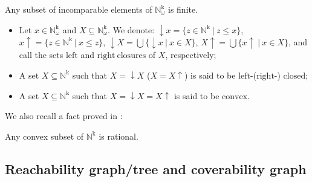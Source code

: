 \documentclass[a4paper]{llncs}
\begin{document}
\begin{lemma} 
\label{l26}
Any subset of incomparable elements of  $\mathbb{N}_\omega^\mathrm{k}$ is finite.
\end{lemma}

\begin{definition}
\label{def_clos}
\begin{itemize}
\item Let $x \in \mathbb{N}_\omega^\mathrm{k}$ and $X\subseteq\mathbb{N}_\omega^\mathrm{k}$. We denote:  $\downarrow x = \{z\in \mathbb{N}^\mathrm{k}\ |\ z\leq x\}$, \\$x\uparrow  = \{z\in \mathbb{N}^\mathrm{k}\ | \ x\leq z\}$,  $\downarrow X = \bigcup\{\downarrow \!x\ | \ x\in X\}$, $ X\uparrow = \bigcup\{ x\uparrow\ |\ x \in X\}$, and call the sets $\mathrm{left}$ and $\mathrm{right\ closures}$ of $X$, respectively;
\item A set $X\subseteq \mathbb{N}^\mathrm{k}$ such that $X= \downarrow X$ ($X=X\uparrow$) is said to be $\mathrm{left}$-($\mathrm{right}$-) $\mathrm{closed}$;
\item A set $X\subseteq \mathbb{N}^\mathrm{k}$ such that $X= \downarrow X=X\uparrow$  is said to be $\mathrm{convex}$.
\end{itemize}


\end{definition}
We also recall a fact proved in \cite{BarOch}:

\begin{proposition}
\label{p26}
Any convex subset of $\mathbb{N}^\mathrm{k}$ is rational.
\end{proposition}

\subsection{Reachability graph/tree and coverability graph}
\end{document}
